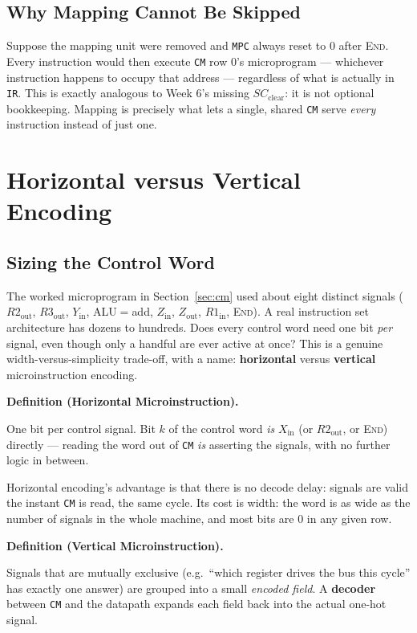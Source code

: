 \documentclass[11pt]{article}
\newenvironment{definitionbox}[1]{%
  \par\noindent\textbf{Definition (#1).}\ \itshape
}{\par\vspace{0.3em}}
\begin{document}
\subsection{Why Mapping Cannot Be Skipped}

Suppose the mapping unit were removed and \texttt{MPC} always reset to 0 after \textsc{End}. Every instruction would then execute \texttt{CM} row 0's microprogram --- whichever instruction happens to occupy that address --- regardless of what is actually in \texttt{IR}. This is exactly analogous to Week 6's missing $SC_{\text{clear}}$: it is not optional bookkeeping. Mapping is precisely what lets a single, shared \texttt{CM} serve \emph{every} instruction instead of just one.

\section{Horizontal versus Vertical Encoding}
\label{sec:encoding}

\subsection{Sizing the Control Word}

The worked microprogram in Section~\ref{sec:cm} used about eight distinct signals ($R2_{\text{out}}$, $R3_{\text{out}}$, $Y_{\text{in}}$, ALU$=$add, $Z_{\text{in}}$, $Z_{\text{out}}$, $R1_{\text{in}}$, \textsc{End}). A real instruction set architecture has dozens to hundreds. Does every control word need one bit \emph{per} signal, even though only a handful are ever active at once? This is a genuine width-versus-simplicity trade-off, with a name: \textbf{horizontal} versus \textbf{vertical} microinstruction encoding.

\begin{definitionbox}{Horizontal Microinstruction}
One bit per control signal. Bit $k$ of the control word \emph{is} $X_{\text{in}}$ (or $R2_{\text{out}}$, or \textsc{End}) directly --- reading the word out of \texttt{CM} \emph{is} asserting the signals, with no further logic in between.
\end{definitionbox}

Horizontal encoding's advantage is that there is no decode delay: signals are valid the instant \texttt{CM} is read, the same cycle. Its cost is width: the word is as wide as the number of signals in the whole machine, and most bits are 0 in any given row.

\begin{definitionbox}{Vertical Microinstruction}
Signals that are mutually exclusive (e.g.\ ``which register drives the bus this cycle'' has exactly one answer) are grouped into a small \emph{encoded field}. A \textbf{decoder} between \texttt{CM} and the datapath expands each field back into the actual one-hot signal.
\end{definitionbox}
\end{document}
